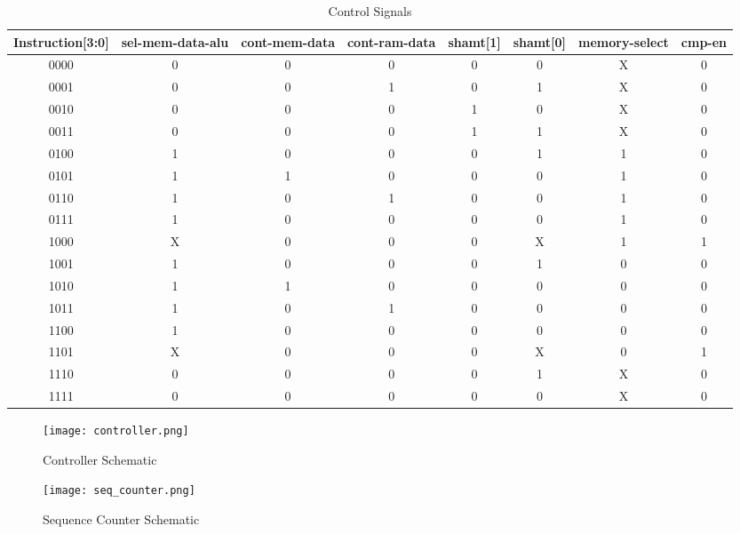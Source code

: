 \documentclass[12pt]{article}
\begin{document}
\begin{landscape}
\pagestyle{empty}


\begin{table}[h]
\centering
\begin{tabular}{|c|c|c|c|c|c|c|c|}
\hline 
\textbf{Instruction[3:0]} & \textbf{sel-mem-data-alu} & \textbf{cont-mem-data} & \textbf{cont-ram-data} & \textbf{shamt[1]} & \textbf{shamt[0]} & \textbf{memory-select} & \textbf{cmp-en} \\ 
\hline 
0000 & 0 & 0 & 0 & 0 & 0 & X & 0 \\ 
\hline 
0001 & 0 & 0 & 1 & 0 & 1 & X & 0 \\ 
\hline 
0010 & 0 & 0 & 0 & 1 & 0 & X & 0 \\ 
\hline 
0011 & 0 & 0 & 0 & 1 & 1 & X & 0 \\ 
\hline 
0100 & 1 & 0 & 0 & 0 & 1 & 1 & 0 \\ 
\hline 
0101 & 1 & 1 & 0 & 0 & 0 & 1 & 0 \\ 
\hline 
0110 & 1 & 0 & 1 & 0 & 0 & 1 & 0 \\ 
\hline 
0111 & 1 & 0 & 0 & 0 & 0 & 1 & 0 \\ 
\hline 
1000 & X & 0 & 0 & 0 & X & 1 & 1 \\ 
\hline 
1001 & 1 & 0 & 0 & 0 & 1 & 0 & 0 \\ 
\hline 
1010 & 1 & 1 & 0 & 0 & 0 & 0 & 0 \\ 
\hline 
1011 & 1 & 0 & 1 & 0 & 0 & 0 & 0 \\ 
\hline 
1100 & 1 & 0 & 0 & 0 & 0 & 0 & 0 \\ 
\hline 
1101 & X & 0 & 0 & 0 & X & 0 & 1 \\ 
\hline 
1110 & 0 & 0 & 0 & 0 & 1 & X & 0 \\ 
\hline 
1111 & 0 & 0 & 0 & 0 & 0 & X & 0 \\ 
\hline 
\end{tabular} 
\caption{Control Signals}
\label{signals}
\end{table}







\begin{figure}[H]
\centering
\texttt{[image: controller.png]}
\caption{Controller Schematic}
\label{controller}
\end{figure}

\begin{figure}[H]
\centering
\texttt{[image: seq\_counter.png]}
\caption{Sequence Counter Schematic}
\label{seq_cnt}
\end{figure}
\end{landscape}
\end{document}
